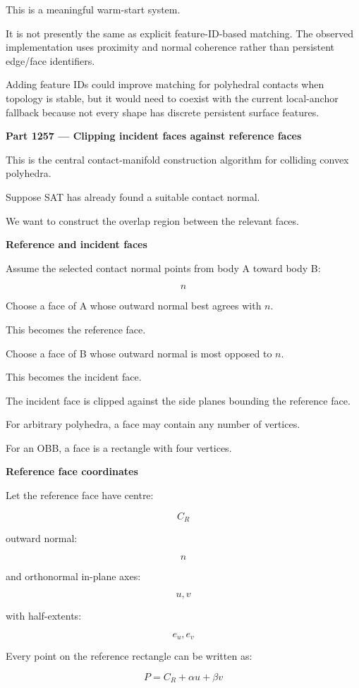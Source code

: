 This is a meaningful warm-start system.

It is not presently the same as explicit feature-ID-based matching. The observed implementation uses proximity and normal coherence rather than persistent edge/face identifiers.

Adding feature IDs could improve matching for polyhedral contacts when topology is stable, but it would need to coexist with the current local-anchor fallback because not every shape has discrete persistent surface features.

\textbf{Part 1257 --- Clipping incident faces against reference faces}

This is the central contact-manifold construction algorithm for colliding convex polyhedra.

Suppose SAT has already found a suitable contact normal.

We want to construct the overlap region between the relevant faces.

\textbf{Reference and incident faces}

Assume the selected contact normal points from body A toward body B:

\[
n
\]

Choose a face of A whose outward normal best agrees with \(n\).

This becomes the reference face.

Choose a face of B whose outward normal is most opposed to \(n\).

This becomes the incident face.

The incident face is clipped against the side planes bounding the reference face.

For arbitrary polyhedra, a face may contain any number of vertices.

For an OBB, a face is a rectangle with four vertices.

\textbf{Reference face coordinates}

Let the reference face have centre:

\[
C_R
\]

outward normal:

\[
n
\]

and orthonormal in-plane axes:

\[
u,v
\]

with half-extents:

\[
e_u,e_v
\]

Every point on the reference rectangle can be written as:

\[
\boxed{ P=C_R+\alpha u+\beta v }
\]

